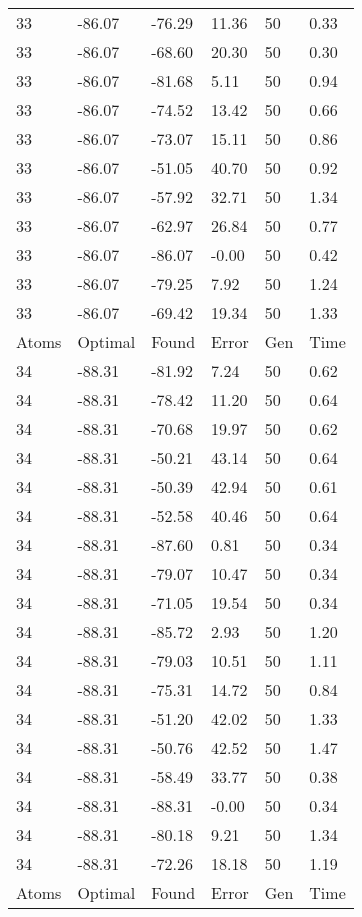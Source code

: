 \documentclass{report}
\begin{document}
\begin{appendix}
\begin{longtable}{llllll}
33 & -86.07 & -76.29 & 11.36 & 50 & 0.33 \\
33 & -86.07 & -68.60 & 20.30 & 50 & 0.30 \\
33 & -86.07 & -81.68 & 5.11 & 50 & 0.94 \\
33 & -86.07 & -74.52 & 13.42 & 50 & 0.66 \\
33 & -86.07 & -73.07 & 15.11 & 50 & 0.86 \\
33 & -86.07 & -51.05 & 40.70 & 50 & 0.92 \\
33 & -86.07 & -57.92 & 32.71 & 50 & 1.34 \\
33 & -86.07 & -62.97 & 26.84 & 50 & 0.77 \\
33 & -86.07 & -86.07 & -0.00 & 50 & 0.42 \\
33 & -86.07 & -79.25 & 7.92 & 50 & 1.24 \\
33 & -86.07 & -69.42 & 19.34 & 50 & 1.33 \\
Atoms & Optimal & Found & Error & Gen & Time \\
34 & -88.31 & -81.92 & 7.24 & 50 & 0.62 \\
34 & -88.31 & -78.42 & 11.20 & 50 & 0.64 \\
34 & -88.31 & -70.68 & 19.97 & 50 & 0.62 \\
34 & -88.31 & -50.21 & 43.14 & 50 & 0.64 \\
34 & -88.31 & -50.39 & 42.94 & 50 & 0.61 \\
34 & -88.31 & -52.58 & 40.46 & 50 & 0.64 \\
34 & -88.31 & -87.60 & 0.81 & 50 & 0.34 \\
34 & -88.31 & -79.07 & 10.47 & 50 & 0.34 \\
34 & -88.31 & -71.05 & 19.54 & 50 & 0.34 \\
34 & -88.31 & -85.72 & 2.93 & 50 & 1.20 \\
34 & -88.31 & -79.03 & 10.51 & 50 & 1.11 \\
34 & -88.31 & -75.31 & 14.72 & 50 & 0.84 \\
34 & -88.31 & -51.20 & 42.02 & 50 & 1.33 \\
34 & -88.31 & -50.76 & 42.52 & 50 & 1.47 \\
34 & -88.31 & -58.49 & 33.77 & 50 & 0.38 \\
34 & -88.31 & -88.31 & -0.00 & 50 & 0.34 \\
34 & -88.31 & -80.18 & 9.21 & 50 & 1.34 \\
34 & -88.31 & -72.26 & 18.18 & 50 & 1.19 \\
Atoms & Optimal & Found & Error & Gen & Time \\

\end{longtable}
\end{appendix}
\end{document}

